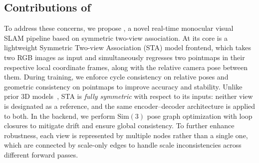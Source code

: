 
\subsection{Contributions of \ours}




To address these concerns, we propose \ours, a novel real-time monocular visual SLAM pipeline based on symmetric two-view association. At its core is a lightweight Symmetric Two-view Association (STA) model frontend, which takes two RGB images as input and simultaneously regresses two pointmaps in their respective local coordinate frames, along with the relative camera pose between them. During training, we enforce cycle consistency on relative poses and geometric consistency on pointmaps to improve accuracy and stability. Unlike prior 3D models~\cite{dust3r,mast3r,wang2025vggt}, STA is \textit{fully symmetric} with respect to its inputs: neither view is designated as a reference, and the same encoder–decoder architecture is applied to both. In the backend, we perform $\mathrm{Sim}(3)$ pose graph optimization with loop closures to mitigate drift and ensure global consistency. To further enhance robustness, each view is represented by multiple nodes rather than a single one, which are connected by scale-only edges to handle scale inconsistencies across different forward passes.




